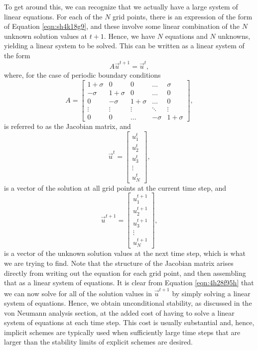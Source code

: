 To get around this, we can recognize that we actually have a large system of linear equations. For each of the $N$ grid points, there is an expression of the form of Equation \ref{eqn:sh4k18g9}, and these involve some linear combination of the $N$ unknown solution values at $t+1$. Hence, we have $N$ equations and $N$ unknowns, yielding a linear system to be solved. This can be written as a linear system of the form
\begin{equation}
	\label{eqn:4h28f95h}
	A \vec{u}^{t+1} = \vec{u}^{t},
\end{equation} 
where, for the case of periodic boundary conditions
\begin{equation}
	A = 
	\begin{bmatrix}
	    1+\sigma & 0 & 0 & \dots  & \sigma \\
	    -\sigma & 1+\sigma & 0 & \dots  & 0 \\
			0 & -\sigma & 1+\sigma & \dots  & 0 \\
	    \vdots & \vdots & \vdots & \ddots & \vdots \\
	    0 & 0 & \dots & -\sigma  & 1+\sigma
	\end{bmatrix},
\end{equation}
is referred to as the Jacobian matrix, and
\begin{equation}
	\vec{u}^{t} = \begin{bmatrix}
	    u_1^t \\
	    u_2^t \\
		u_3^t \\
	    \vdots  \\
	    u_N^t
	\end{bmatrix},
\end{equation}
is a vector of the solution at all grid points at the current time step, and
\begin{equation}
	\vec{u}^{t+1} = \begin{bmatrix}
	    u_1^{t+1} \\
	    u_2^{t+1} \\
		u_3^{t+1} \\
	    \vdots  \\
	    u_N^{t+1}
	\end{bmatrix},
\end{equation}
is a vector of the unknown solution values at the next time step, which is what we are trying to find. Note that the structure of the Jacobian matrix arises directly from writing out the equation for each grid point, and then assembling that as a linear system of equations. It is clear from Equation \ref{eqn:4h28f95h} that we can now solve for all of the solution values in $\vec{u}^{t+1}$ by simply solving a linear system of equations. Hence, we obtain unconditional stability, as discussed in the von Neumann analysis section, at the added cost of having to solve a linear system of equations at each time step. This cost is usually substantial and, hence, implicit schemes are typically used when sufficiently large time steps that are larger than the stability limits of explicit schemes are desired.

